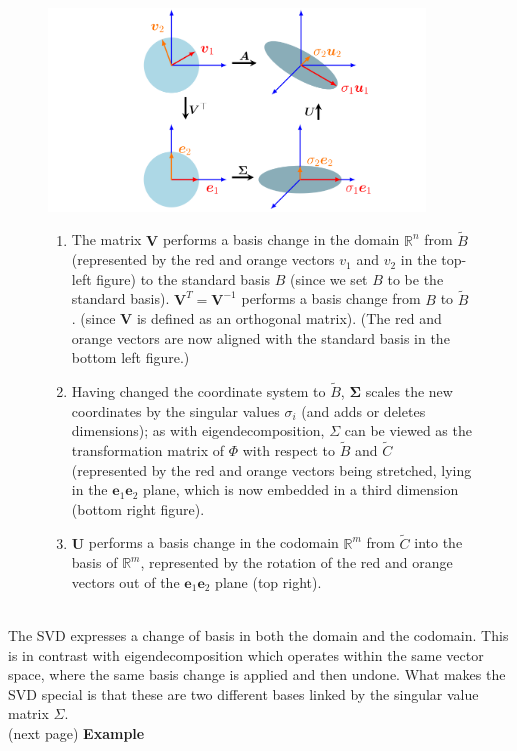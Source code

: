 \documentclass{report}
\begin{document}
\begin{figure}[h]
\includegraphics[width=10cm]{22}\\
\centering
\begin{enumerate}
\item The matrix $\bm{V}$ performs a basis change in the domain
$\mathbb{R}^n$ from $\tilde{B}$ (represented 
by the red and orange vectors $v_1$ and $v_2$ in the top-left figure) to the standard basis $B$ 
(since we set $B$ to be the standard basis).
$\bm{V}^T=\bm{V}^{-1}$ performs a basis change from $B$ to $\tilde{B}$. 
(since $\bm{V}$ is defined as an orthogonal matrix). (The red and orange vectors are now aligned with the
standard basis in the bottom left figure.)
\item Having changed the coordinate system to $\tilde{B}$, $\bm{\Sigma}$ scales the new coordinates by the singular
values $\sigma_i$ (and adds or deletes dimensions); as
with eigendecomposition, $\Sigma$ can be viewed as the transformation matrix of $\Phi$ with respect to $\tilde{B}$
and $\tilde{C}$ (represented by the red and orange vectors being stretched, lying in the $\bm{e}_1\bm{e}_2$ plane, 
which is now embedded in a third dimension (bottom right figure).
\item $\bm{U}$ performs a basis change in the codomain $\mathbb{R}^m$ from $\tilde{C}$ into the basis of 
$\mathbb{R}^m$, represented by the rotation of the red and orange vectors out of the $\bm{e}_1\bm{e}_2$ plane
(top right).
\end{enumerate}
\end{figure}\\
The SVD expresses a change of basis in both the domain and the codomain. This is in contrast with eigendecomposition
which operates within the same vector space, where the same basis change is applied and then undone.
What makes the SVD special is that these are two different bases linked by the singular value matrix $\Sigma$.\\
(next page)
\newpage
\noindent\textbf{Example}\\
\end{document}
